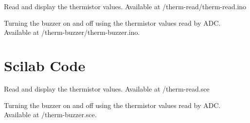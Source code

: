 \begin{ardcode}
{Read and display the thermistor values.  Available at
  \LocTHERMardbrief/therm-read/therm-read.ino}
\label{ard:therm-read}

\end{ardcode}

\begin{ardcode}
{Turning the buzzer on and off using the thermistor values read by ADC.  Available at
  \LocTHERMardbrief/therm-buzzer/therm-buzzer.ino.}
\label{ard:therm-buzzer}

\end{ardcode}


\section{Scilab Code}
\label{sec:therm-scilab-code}

\begin{scicode}
{Read and display the thermistor values.  Available at
  \LocTHERMscibrief/therm-read.sce} 
\label{sci:therm-read}

\end{scicode}

\begin{scicode}
{Turning the buzzer on and off using the thermistor values read by ADC.  Available at
  \LocTHERMscibrief/therm-buzzer.sce.} 
\label{sci:therm-buzzer}

\end{scicode}
